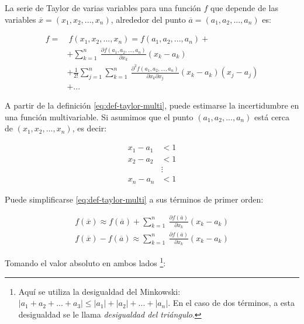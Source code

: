 \begin{definition}

    La serie de Taylor de varias variables para una función $f$ que depende
    de las variables $\overline{x} = (x_1, x_2, ..., x_n)$, alrededor del
    punto $ \overline{a} = (a_1, a_2, ..., a_n)$ es:

    \begin{align*}
        f = & \ f(x_1, x_2, ..., x_n) = f(a_1, a_2, ..., a_n) + \\ 
            & + \sum_{k=1}^{n} \
            \frac{\partial f(a_1,a_2,...,a_n)}{\partial x_k}(x_k-a_k)\\
            & + \frac{1}{2!} \sum_{j=1}^{n} \sum_{k=1}^{n} \
            \frac{\partial^2 f(a_1,a_2,...,a_n)}{\partial x_k \partial
            x_j}(x_k-a_k)(x_j-a_j)\\
            & + ...
    \end{align*}
    \label{eq:def-taylor-multi}

\end{definition}

A partir de la definición \ref{eq:def-taylor-multi}, puede estimarse la
incertidumbre en una función multivariable. Si asumimos que el punto $(a_1, a_2,
..., a_n)$ está cerca de $(x_1, x_2, ..., x_n)$, es decir:

\begin{align*}
    x_1 - a_1 &< 1 \\
    x_2 - a_2 &< 1 \\
              &\vdots \\
    x_n - a_n &< 1
\end{align*}

Puede simplificarse \ref{eq:def-taylor-multi} a sus términos de primer orden:

\begin{align*}
    f(\overline{x}) \approx f(\overline{a}) + \sum_{k=1}^{n} \
        \frac{\partial f(\overline{a})}{\partial x_k} (x_k - a_k) \\
    f(\overline{x}) - f(\overline{a}) \approx \sum_{k=1}^{n} \
        \frac{\partial f(\overline{a})}{\partial x_k} (x_k - a_k)
\end{align*}

Tomando el valor absoluto en ambos lados \footnote{Aquí se utiliza la
desigualdad del Minkowski: $|a_1 + a_2 + ... + a_3| \leq |a_1| + |a_2| + ... +
|a_n|$. En el caso de dos términos, a esta desigualdad se le llama
\textit{desigualdad del triángulo}.}:

